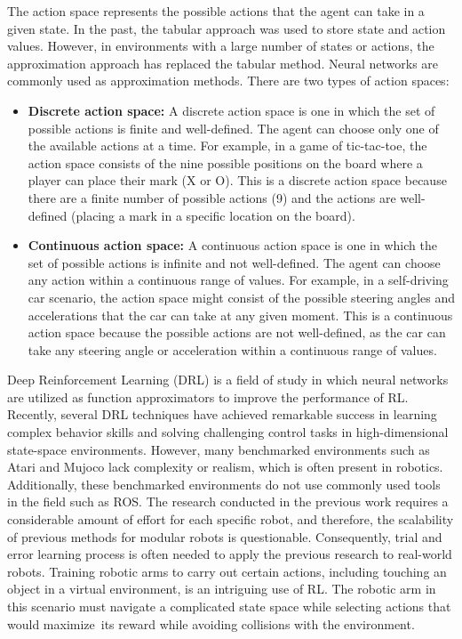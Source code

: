 \documentclass[12pt,oneside]{article}
\begin{document}
 The action space represents the possible actions that the agent can take in a given state. In the past, the tabular approach was used to store state and action values. However, in environments with a large number of states or actions, the approximation approach has replaced the tabular method. Neural networks are commonly used as approximation methods. There are two types of action spaces:
 \begin{itemize}
\item \textbf{ Discrete action space:} A discrete action space is one in which the set of possible actions is finite and well-defined. The agent can choose only one of the available actions at a time. For example, in a game of tic-tac-toe, the action space consists of the nine possible positions on the board where a player can place their mark (X or O). This is a discrete action space because there are a finite number of possible actions (9) and the actions are well-defined (placing a mark in a specific location on the board).
\item \textbf{ Continuous action space:} A continuous action space is one in which the set of possible actions is infinite and not well-defined. The agent can choose any action within a continuous range of values. For example, in a self-driving car scenario, the action space might consist of the possible steering angles and accelerations that the car can take at any given moment. This is a continuous action space because the possible actions are not well-defined, as the car can take any steering angle or acceleration within a continuous range of values.
 \end{itemize}

Deep Reinforcement Learning (DRL) is a field of study in which neural networks are utilized as function approximators to improve the performance of RL. Recently, several DRL techniques have achieved remarkable success in learning complex behavior skills and solving challenging control tasks in high-dimensional state-space \cite{28_wu2017scalable} environments. However, many benchmarked environments such as Atari \cite{29_mnih2013playing} and Mujoco \cite{30_todorov2012mujoco} lack complexity or realism, which is often present in robotics. Additionally, these benchmarked environments \cite{31_nogueira2017autonomously} do not use commonly used tools in the field such as ROS.
The research conducted in the previous work requires a considerable amount of effort for each specific robot, and therefore, the scalability of previous methods for modular robots is questionable. Consequently, trial and error learning process is often needed to apply the previous research to real-world robots. Training robotic arms to carry out certain actions, including touching an object in a virtual environment, is an intriguing use of RL. The robotic arm in this scenario must navigate a complicated state space while selecting actions that would maximize its reward while avoiding collisions with the environment. 
\end{document}
